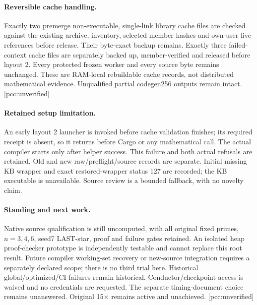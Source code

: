 \documentclass[10pt,a4paper]{article}
\begin{document}
\paragraph{Reversible cache handling.} Exactly two premerge non-executable,
single-link library cache files are checked against the existing archive,
inventory, selected member hashes and own-user live references before release.
Their byte-exact backup remains. Exactly three failed-context cache files are
separately backed up, member-verified and released before layout 2. Every
protected frozen worker and every source byte remains unchanged. These are
RAM-local rebuildable cache records, not distributed mathematical evidence.
Unqualified partial codegen256 outputs remain intact. [pcc:unverified]
\paragraph{Retained setup limitation.} An early layout 2 launcher is invoked
before cache validation finishes; its required receipt is absent, so it
returns before Cargo or any mathematical call. The actual compiler starts
only after helper success. This failure and both actual refusals are retained.
Old and new raw/preflight/source records are separate. Initial missing KB
wrapper and exact restored-wrapper status 127 are recorded; the KB executable
is unavailable. Source review is a bounded fallback, with no novelty claim.
\paragraph{Standing and next work.} Native source qualification is still
uncomputed, with all original fixed primes, $n=3,4,6$, seed7 LAST-star, proof and failure
gates retained. An isolated heap proof-checker prototype is independently
testable and cannot replace this root result. Future compiler working-set
recovery or new-source integration requires a separately declared scope;
there is no third trial here. Historical global/optimized/CI failures remain
historical. Conductor/checkpoint access is waived and no credentials are
requested. The separate timing-document choice remains unanswered.
Original 15$\times$ remains active and unachieved. [pcc:unverified]
\end{document}
